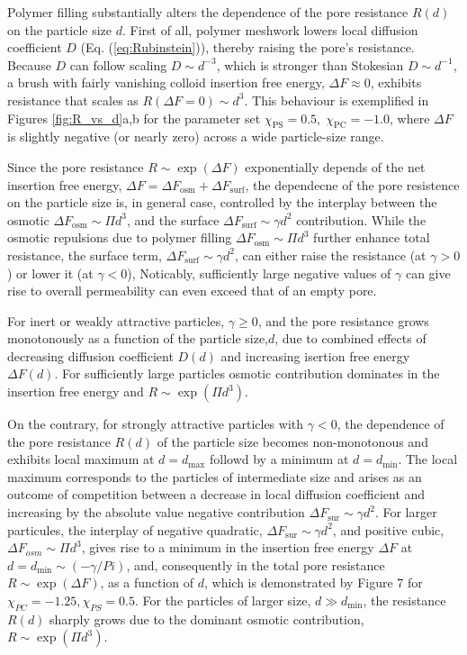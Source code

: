 \documentclass[12pt, a4paper]{article}
\begin{document}


Polymer filling substantially alters the dependence  of the pore resistance $R(d)$ on the particle size $d$.
First of all, polymer meshwork lowers local diffusion coefficient $D$ (Eq. (\ref{eq:Rubinstein})), thereby raising the pore's resistance.
Because $D$ can follow scaling $D \sim d^{-3}$, which is stronger than Stokesian $D \sim d^{-1}$, a brush with 
fairly vanishing colloid insertion free energy, $\Delta F\approx 0$,
exhibits resistance that scales as $R(\Delta F=0)\sim d^{3}$.
This behaviour is exemplified in Figures \ref{fig:R_vs_d}a,b for the parameter set $\chi_{\text{PS}}=0.5,\;\chi_{\text{PC}}=-1.0$, 
where $\Delta F$ is slightly negative (or nearly zero) across a wide particle-size range.

Since the pore resistance $R\sim \exp (\Delta F)$ exponentially depends of the net insertion free energy, 
$\Delta F=\Delta F_{\text{osm}}+ \Delta F_{\text{surf}}$,
the dependecne of the pore resistence on the particle size is, in general case, controlled by the interplay between
the osmotic $\Delta F_{\text{osm}} \sim \Pi d^3$, and the surface $\Delta F_{\text{surf}} \sim \gamma d^2$ contribution. 
While the osmotic repulsions due to polymer filling $\Delta F_{\text{osm}} \sim \Pi d^3$ further enhance total resistance,  
the surface term, $\Delta F_{\text{surf}} \sim \gamma d^2$, can either raise the resistance (at $\gamma>0$) or lower it (at $\gamma<0$), 
Noticably, sufficiently large negative values of $\gamma$ can give rise to overall permeability can even exceed that of an empty pore.

For inert or weakly attractive particles, $\gamma\geq 0$, and the pore resistance grows monotonously as a function of the particle size,$d$,
due to combined effects of decreasing diffusion coefficient $D(d)$ and increasing isertion free energy  $\Delta F(d)$.
For sufficiently large particles osmotic contribution dominates in the insertion free energy and $R\sim \exp (\Pi d^3)$.

On the contrary, for strongly attractive particles with $\gamma <0$, the dependence of the pore resistance $R(d)$ of the particle size
becomes non-monotonous and exhibits local maximum at $d=d_{\text{max}}$ followd by a minimum at $d=d_{\text{min}}$.
The local maximum corresponds to the particles of intermediate size and arises as an outcome of competition between a decrease in local diffusion coefficient and increasing by the absolute value negative
contribution $\Delta F_{\text{sur}}\sim \gamma d^2$. For larger particules,
the interplay of negative quadratic, $\Delta F_{\text{sur}}\sim \gamma d^2$,
and positive cubic, $\Delta F_{osm}\sim \Pi d^3$, gives rise to a minimum in the insertion free energy $\Delta F$ at $d=d_{\text{min}}\sim (-\gamma/Pi)$, and, 
consequently in the total pore resistance $R\sim \exp(\Delta F)$, as a function of $d$, which is demonstrated by Figure 7 for $\chi_{PC}=-1.25, \chi_{PS}=0.5$. 
For the particles of larger size, $d\gg d_{\text{min}}$, the resistance $R(d)$ sharply grows due to the dominant osmotic contribution, 
$R\sim \exp(\Pi d^3)$.
\end{document}
